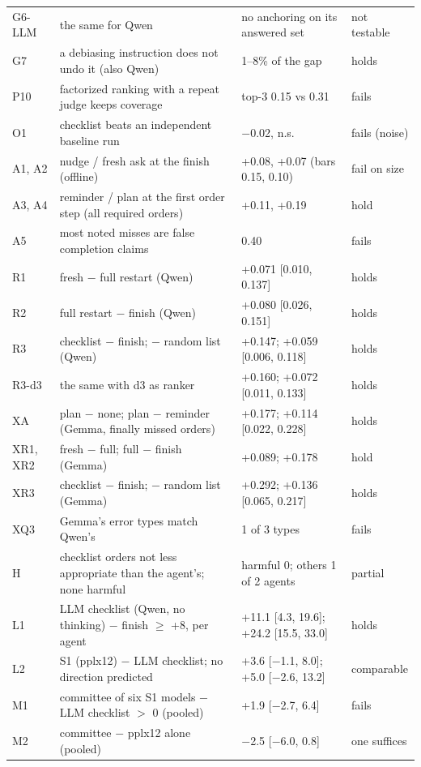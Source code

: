 \documentclass[11pt]{article}
\begin{document}
\begin{table}[t]
\begin{tabular}{@{}p{}p{}p{}l@{}}
G6-LLM & the same for Qwen & no anchoring on its answered set & not testable \\
G7 & a debiasing instruction does not undo it (also Qwen) & 1--8\% of the gap & holds \\
P10 & factorized ranking with a repeat judge keeps coverage & top-3 0.15 vs 0.31 & fails \\
O1 & checklist beats an independent baseline run & $-$0.02, n.s. & fails (noise) \\
A1, A2 & nudge / fresh ask at the finish (offline) & +0.08, +0.07 (bars 0.15, 0.10) & fail on size \\
A3, A4 & reminder / plan at the first order step (all required orders) & +0.11, +0.19 & hold \\
A5 & most noted misses are false completion claims & 0.40 & fails \\
R1 & fresh $-$ full restart (Qwen) & +0.071 [0.010, 0.137] & holds \\
R2 & full restart $-$ finish (Qwen) & +0.080 [0.026, 0.151] & holds \\
R3 & checklist $-$ finish; $-$ random list (Qwen) & +0.147; +0.059 [0.006, 0.118] & holds \\
R3-d3 & the same with d3 as ranker & +0.160; +0.072 [0.011, 0.133] & holds \\
XA & plan $-$ none; plan $-$ reminder (Gemma, finally missed orders) & +0.177; +0.114 [0.022, 0.228] & holds \\
XR1, XR2 & fresh $-$ full; full $-$ finish (Gemma) & +0.089; +0.178 & hold \\
XR3 & checklist $-$ finish; $-$ random list (Gemma) & +0.292; +0.136 [0.065, 0.217] & holds \\
XQ3 & Gemma's error types match Qwen's & 1 of 3 types & fails \\
H & checklist orders not less appropriate than the agent's; none harmful & harmful 0; others 1 of 2 agents & partial \\
L1 & LLM checklist (Qwen, no thinking) $-$ finish $\ge$ +8, per agent & +11.1 [4.3, 19.6]; +24.2 [15.5, 33.0] & holds \\
L2 & S1 (pplx12) $-$ LLM checklist; no direction predicted & +3.6 [$-$1.1, 8.0]; +5.0 [$-$2.6, 13.2] & comparable \\
M1 & committee of six S1 models $-$ LLM checklist $>$ 0 (pooled) & +1.9 [$-$2.7, 6.4] & fails \\
M2 & committee $-$ pplx12 alone (pooled) & $-$2.5 [$-$6.0, 0.8] & one suffices \\

\end{tabular}
\end{table}
\end{document}
